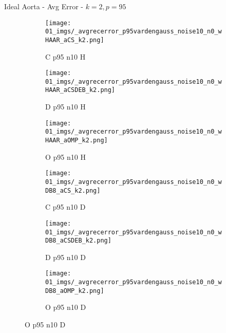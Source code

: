 \begin{frame}{Ideal Aorta - Avg Error - $k=2,p=95$}{}
\begin{figure}
\begin{subfigure}{0.13\textwidth}
\texttt{[image: 01\_imgs/\_avgrecerror\_p95vardengauss\_noise10\_n0\_wHAAR\_aCS\_k2.png]}
\caption*{\tiny C p95 n10 H}
\end{subfigure}
\begin{subfigure}{0.13\textwidth}
\texttt{[image: 01\_imgs/\_avgrecerror\_p95vardengauss\_noise10\_n0\_wHAAR\_aCSDEB\_k2.png]}
\caption*{\tiny D p95 n10 H}
\end{subfigure}
\begin{subfigure}{0.13\textwidth}
\texttt{[image: 01\_imgs/\_avgrecerror\_p95vardengauss\_noise10\_n0\_wHAAR\_aOMP\_k2.png]}
\caption*{\tiny O p95 n10 H}
\end{subfigure}
\begin{subfigure}{0.13\textwidth}
\texttt{[image: 01\_imgs/\_avgrecerror\_p95vardengauss\_noise10\_n0\_wDB8\_aCS\_k2.png]}
\caption*{\tiny C p95 n10 D}
\end{subfigure}
\begin{subfigure}{0.13\textwidth}
\texttt{[image: 01\_imgs/\_avgrecerror\_p95vardengauss\_noise10\_n0\_wDB8\_aCSDEB\_k2.png]}
\caption*{\tiny D p95 n10 D}
\end{subfigure}
\begin{subfigure}{0.13\textwidth}
\texttt{[image: 01\_imgs/\_avgrecerror\_p95vardengauss\_noise10\_n0\_wDB8\_aOMP\_k2.png]}
\caption*{\tiny O p95 n10 D}
\end{subfigure}

\vspace{5pt}


\end{figure}
\end{frame}

